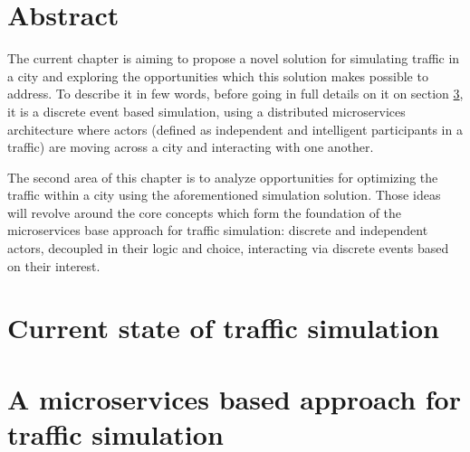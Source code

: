 \documentclass[a4paper,12pt,twoside]{book}
\begin{document}
\section{Abstract}

The current chapter is aiming to propose a novel solution for simulating traffic in a city and exploring the opportunities which this solution makes possible to address. To describe it in few words, before going in full details on it on section \ref{sec:microservicesbasedapproachtrafficsim}, it is a discrete event based simulation, using a distributed microservices architecture where actors (defined as independent and intelligent participants in a traffic) are moving across a city and interacting with one another.

The second area of this chapter is to analyze opportunities for optimizing the traffic within a city using the aforementioned simulation solution. Those ideas will revolve around the core concepts which form the foundation of the microservices base approach for traffic simulation: discrete and independent actors, decoupled in their logic and choice, interacting via discrete events based on their interest.

\section{Current state of traffic simulation}

\section{A microservices based approach for traffic simulation}
\label{sec:microservicesbasedapproachtrafficsim}
\end{document}
